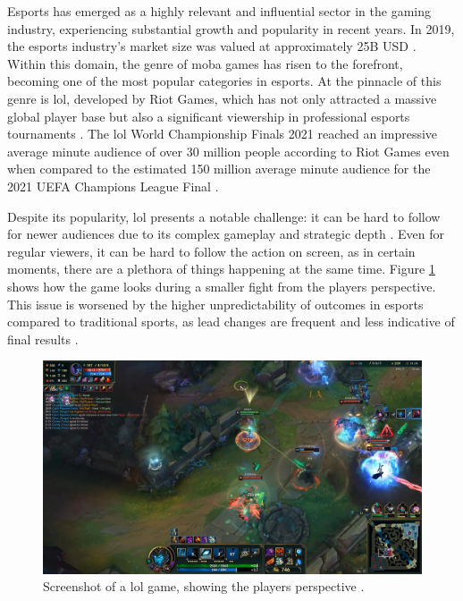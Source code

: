 \documentclass[12pt, a4paper, headinclude, twoside, plainheadsepline, open=right, numbers=noenddot, hidelinks, toc=listof, toc=bibliography]{scrreprt}
\begin{document}
Esports has emerged as a highly relevant and influential sector in the gaming industry, experiencing substantial growth and popularity in recent years. 
In 2019, the esports industry's market size was valued at approximately 25B USD \cite{ahnOneBillionDollar2020}.
Within this domain, the genre of \ac{moba} games has risen to the forefront, becoming one of the most popular categories in esports. 
At the pinnacle of this genre is \ac{lol}, developed by Riot Games, which has not only attracted a massive global player base but also a significant viewership in professional esports tournaments \cite{goughLeagueLegendsChampionships}. 
The \acl{lol} World Championship Finals 2021 reached an impressive average minute audience of over 30 million people according to Riot Games \cite{riotgamesHowRiotEsports2022} even when compared to the estimated 150 million average minute audience for the 2021 UEFA Champions League Final \cite{dalmiaChampionsLeagueFinal2023}.

Despite its popularity, \ac{lol} presents a notable challenge: it can be hard to follow for newer audiences due to its complex gameplay and strategic depth \cite{campbell2021sports}. 
Even for regular viewers, it can be hard to follow the action on screen, as in certain moments, there are a plethora of things happening at the same time.
Figure \ref{fig:screenshot} shows how the game looks during a smaller fight from the players perspective.
This issue is worsened by the higher unpredictability of outcomes in esports compared to traditional sports, as lead changes are frequent and less indicative of final results \cite{campbell2021sports}.

\begin{figure}[htbp]
\includegraphics[width=\textwidth]{./images/LolScreenshot1.jpg}
\caption[Screenshot of a \ac{lol} game, showing the players perspective.]{Screenshot of a \ac{lol} game, showing the players perspective \cite{fearless-ad5644HighlightMyLOL2024}.}
\label{fig:screenshot}
\end{figure}
\end{document}
